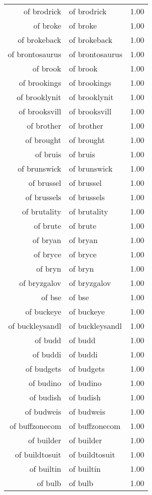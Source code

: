 \begin{table}[ht]
\begin{tabular}{rlr}
  of brodrick & of brodrick & 1.00 \\ 
  of broke & of broke & 1.00 \\ 
  of brokeback & of brokeback & 1.00 \\ 
  of brontosaurus & of brontosaurus & 1.00 \\ 
  of brook & of brook & 1.00 \\ 
  of brookings & of brookings & 1.00 \\ 
  of brooklynit & of brooklynit & 1.00 \\ 
  of brooksvill & of brooksvill & 1.00 \\ 
  of brother & of brother & 1.00 \\ 
  of brought & of brought & 1.00 \\ 
  of bruis & of bruis & 1.00 \\ 
  of brunswick & of brunswick & 1.00 \\ 
  of brussel & of brussel & 1.00 \\ 
  of brussels & of brussels & 1.00 \\ 
  of brutality & of brutality & 1.00 \\ 
  of brute & of brute & 1.00 \\ 
  of bryan & of bryan & 1.00 \\ 
  of bryce & of bryce & 1.00 \\ 
  of bryn & of bryn & 1.00 \\ 
  of bryzgalov & of bryzgalov & 1.00 \\ 
  of bse & of bse & 1.00 \\ 
  of buckeye & of buckeye & 1.00 \\ 
  of buckleysandl & of buckleysandl & 1.00 \\ 
  of budd & of budd & 1.00 \\ 
  of buddi & of buddi & 1.00 \\ 
  of budgets & of budgets & 1.00 \\ 
  of budino & of budino & 1.00 \\ 
  of budish & of budish & 1.00 \\ 
  of budweis & of budweis & 1.00 \\ 
  of buffzonecom & of buffzonecom & 1.00 \\ 
  of builder & of builder & 1.00 \\ 
  of buildtosuit & of buildtosuit & 1.00 \\ 
  of builtin & of builtin & 1.00 \\ 
  of bulb & of bulb & 1.00 \\ 

\end{tabular}
\end{table}
